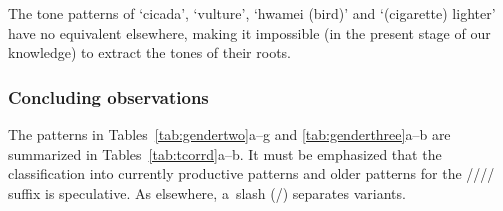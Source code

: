 	The tone patterns of ‘cicada’, ‘vulture’, ‘hwamei (bird)’ and ‘(cigarette) lighter’ have no equivalent elsewhere, making it impossible (in the present stage of our knowledge) to extract the tones of their roots.
	
	
	\subsubsection{Concluding observations}
	\label{sec:concludinggeneralobservations}
	
	
	The patterns in Tables~\ref{tab:gendertwo}a--g and \ref{tab:genderthree}a--b are summarized in Tables~\ref{tab:tcorrd}a--b. It must be emphasized that the classification
	into currently productive patterns and older patterns for the //// {suffix} is speculative. As elsewhere, a~slash (/) separates variants.
	
